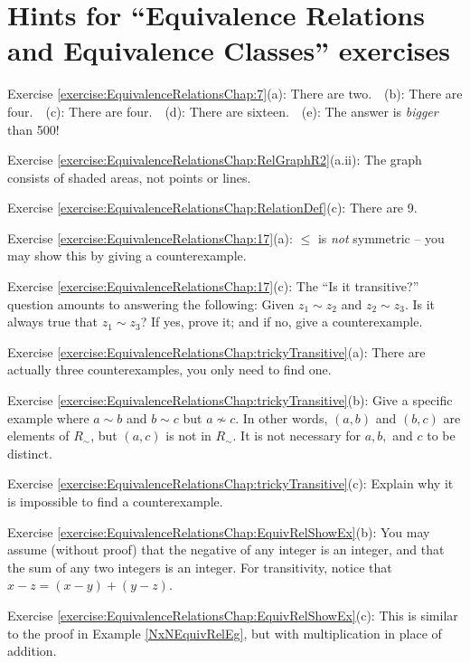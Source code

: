 \section{Hints for ``Equivalence Relations and Equivalence Classes'' exercises}\label{secEqRelChapHints} 

\noindent Exercise \ref{exercise:EquivalenceRelationsChap:7}(a): There are two.~~(b): There are four.~~(c): There are four.~~(d): There are sixteen.~~(e): The answer is \emph{bigger} than 500!

\noindent Exercise \ref{exercise:EquivalenceRelationsChap:RelGraphR2}(a.ii): The graph consists of shaded areas, not points or lines.

\noindent Exercise \ref{exercise:EquivalenceRelationsChap:RelationDef}(c): There are 9.

\noindent Exercise \ref{exercise:EquivalenceRelationsChap:17}(a): $\leq$ is \emph{not} symmetric -- you may show this by giving a counterexample.

\noindent Exercise \ref{exercise:EquivalenceRelationsChap:17}(c): The ``Is it transitive?'' question amounts to answering the following:  Given $z_1 \sim z_2$ and $z_2 \sim z_3$.  Is it always true that $z_1 \sim z_3$?  If yes, prove it; and if no, give a counterexample. 

\noindent Exercise \ref{exercise:EquivalenceRelationsChap:trickyTransitive}(a): There are actually three counterexamples, you only need to find one.

\noindent Exercise \ref{exercise:EquivalenceRelationsChap:trickyTransitive}(b): Give a specific example where $a \sim b$ and $b \sim c$ but $a \not\sim c$.  In other words, $(a,b)$ and $(b,c)$ are elements of $R_{\sim}$, but $(a,c)$ is not in  $R_{\sim}$. It is not necessary for $a,b,$ and $c$ to be distinct.

\noindent Exercise \ref{exercise:EquivalenceRelationsChap:trickyTransitive}(c): Explain why it is impossible to find a counterexample.

\noindent Exercise \ref{exercise:EquivalenceRelationsChap:EquivRelShowEx}(b): You may assume (without proof) that the negative of any integer is an integer, and that the sum of any two integers is an integer. For transitivity, notice that $x - z = (x - y) + (y - z)$.

\noindent Exercise \ref{exercise:EquivalenceRelationsChap:EquivRelShowEx}(c): This is similar to the proof in Example \ref{NxNEquivRelEg}, but with multiplication in place of addition.

